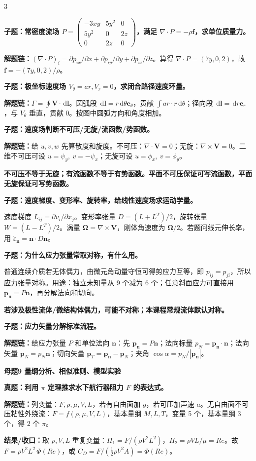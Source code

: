\documentclass[a4paper]{article}
\newcommand{\mt}[1]{\vspace{2pt}\colorbox{M}{\parbox{\dimexpr\linewidth-2\fboxsep}{\color{white}\bfseries #1}}\par}
\newcommand{\qt}[1]{\vspace{1pt}\colorbox{Q}{\parbox{\dimexpr\linewidth-2\fboxsep}{\color{white}\bfseries #1}}\par}
\newcommand{\ans}[1]{\colorbox{G}{\parbox{\dimexpr\linewidth-2\fboxsep}{#1}}\par}
\newcommand{\warn}[1]{\colorbox{Y}{\parbox{\dimexpr\linewidth-2\fboxsep}{\color{E}\bfseries #1}}\par}
\newcommand{\chain}[1]{{\color{A}\bfseries 解题链：}#1\par}
\newcommand{\res}[1]{{\color{E}\bfseries 结果/收口：}#1\par}
\newcommand{\dd}{\,\mathrm d}
\begin{document}
\begin{multicols}{3}
\qt{子题：常密度流场 $P=\begin{pmatrix}-3xy&5y^2&0\\5y^2&0&2z\\0&2z&0\end{pmatrix}$，满足 $\nabla\cdot P=-\rho\bm f$，求单位质量力。}
\chain{$(\nabla\cdot P)_i=\partial p_{ix}/\partial x+\partial p_{iy}/\partial y+\partial p_{iz}/\partial z$。算得 $\nabla\cdot P=(7y,0,2)$，故 $\bm f=-(7y,0,2)/\rho$。}

\qt{子题：极坐标速度场 $V_\theta=ar,V_r=0$，求闭合路径速度环量。}
\chain{$\Gamma=\oint\bm V\cdot\dd\bm l$。圆弧段 $\dd\bm l=r\dd\theta\bm e_\theta$，贡献 $\int ar\cdot r\dd\theta$；径向段 $\dd\bm l=\dd r\bm e_r$，与 $V_\theta$ 垂直，贡献 0。按图中圆弧方向和角度相加。}

\qt{子题：速度场判断不可压/无旋/流函数/势函数。}
\chain{给 $u,v,w$ 先算散度和旋度。不可压：$\nabla\cdot\bm V=0$；无旋：$\nabla\times\bm V=0$。二维不可压可设 $u=\psi_y,\ v=-\psi_x$；无旋可设 $u=\phi_x,\ v=\phi_y$。}
\warn{不可压不等于无旋；有流函数不等于有势函数。平面不可压保证可写流函数，平面无旋保证可写势函数。}

\qt{子题：速度梯度、变形率、旋转率，给线性速度场求运动学量。}
\ans{速度梯度 $L_{ij}=\partial v_i/\partial x_j$。变形率张量 $D=(L+L^T)/2$，旋转张量 $W=(L-L^T)/2$。涡量 $\bm\Omega=\nabla\times\bm V$，刚体角速度为 $\bm\Omega/2$。若题问线元伸长率，用 $\dot\varepsilon_{\bm n}=\bm n\cdot D\bm n$。}

\qt{子题：为什么应力张量常取对称，有什么用。}
\ans{普通连续介质若无体偶力，由微元角动量守恒可得剪应力互等，即 $p_{ij}=p_{ji}$，所以应力张量对称。用途：独立未知量从 9 个减为 6 个；任意斜面应力可直接用 $\bm p_{\bm n}=P\bm n$，再分解法向和切向。}
\warn{若涉及极性流体/微结构体偶力，可能不对称；本课程常规流体默认对称。}

\qt{子题：应力矢量分解标准流程。}
\chain{给应力张量 $P$ 和单位法向 $\bm n$：先 $\bm p_{\bm n}=P\bm n$；法向标量 $p_N=\bm p_{\bm n}\cdot\bm n$；法向矢量 $\bm p_N=p_N\bm n$；切向矢量 $\bm p_T=\bm p_{\bm n}-\bm p_N$；夹角 $\cos\alpha=p_N/|\bm p_{\bm n}|$。}

\mt{母题9 量纲分析、相似准则、模型实验}
\qt{真题：利用 $\pi$ 定理推求水下航行器阻力 $F$ 的表达式。}
\chain{列变量：$F,\rho,\mu,V,L$，若有自由面加 $g$，若可压加声速 $a$。无自由面不可压粘性外绕流：$F=f(\rho,\mu,V,L)$，基本量纲 $M,L,T$，变量 5 个，基本量纲 3 个，得 2 个 $\pi$。}
\res{取 $\rho,V,L$ 重复变量：$\Pi_1=F/(\rho V^2L^2)$，$\Pi_2=\rho VL/\mu=Re$。故 $F=\rho V^2L^2\,\Phi(Re)$，或 $C_D=F/(\frac12\rho V^2A)=\Phi(Re)$。}


\end{multicols}
\end{document}
